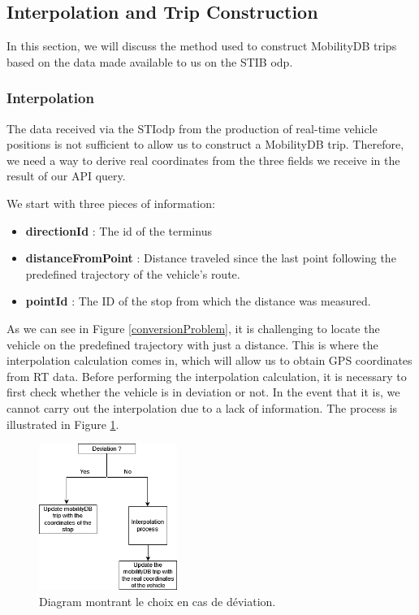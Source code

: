\documentclass[12pt]{report}
\begin{document}
	\subsection{Interpolation and Trip Construction}
	
	In this section, we will discuss the method used to construct MobilityDB trips based on the data made available to us on the STIB \acrshort{odp}.
	
	\subsubsection{Interpolation}
	
	The data received via the STI\acrshort{odp} from the production of real-time vehicle positions is not sufficient to allow us to construct a MobilityDB trip. Therefore, we need a way to derive real coordinates from the three fields we receive in the result of our API query.
	
	We start with three pieces of information:
	
	\begin{itemize}[noitemsep]
		\item \textbf{directionId} : The id of the terminus
		\item \textbf{distanceFromPoint} : Distance traveled since the last point following the predefined trajectory of the vehicle's route.
		\item \textbf{pointId} : The ID of the stop from which the distance was measured.
	\end{itemize}  
	
	
	As we can see in Figure \ref{conversionProblem}, it is challenging to locate the vehicle on the predefined trajectory with just a distance. This is where the interpolation calculation comes in, which will allow us to obtain GPS coordinates from RT data. Before performing the interpolation calculation, it is necessary to first check whether the vehicle is in deviation or not. In the event that it is, we cannot carry out the interpolation due to a lack of information. The process is illustrated in Figure \ref{diagramDeviation}.
	
	\begin{center}
		\begin{figure}
			\centering
			\includegraphics[width=0.4\textwidth]{images/diagram deviation.png}
			\caption{Diagram montrant le choix en cas de déviation.}
			\label{diagramDeviation}
		\end{figure}
	\end{center}
	
\end{document}
